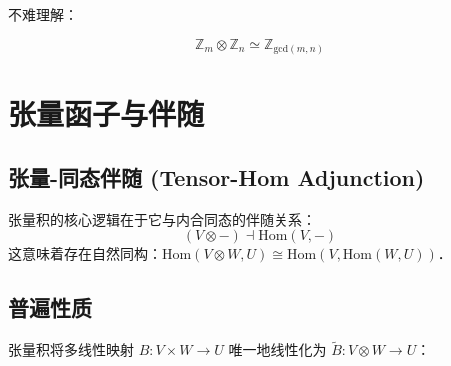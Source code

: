 \documentclass[10pt, openany]{book}
\begin{document}
不难理解：

$$
\mathbb Z_m \otimes \mathbb Z_n \simeq \mathbb Z_{\text{gcd}(m,n)}​
$$

\begin{center}
\end{center}

\chapter{张量函子与伴随}

\section{张量-同态伴随 (Tensor-Hom Adjunction)}
张量积的核心逻辑在于它与内合同态的伴随关系：
\begin{equation}
(V \otimes -) \dashv \mathrm{Hom}(V, -)
\end{equation}
这意味着存在自然同构：$\mathrm{Hom}(V \otimes W, U) \cong \mathrm{Hom}(V, \mathrm{Hom}(W, U))$．

\section{普遍性质}
张量积将多线性映射 $B: V \times W \to U$ 唯一地线性化为 $\tilde{B}: V \otimes W \to U$：
\begin{center}
\end{center}



\end{document}
